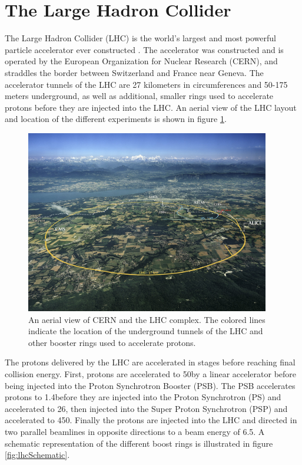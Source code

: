 \section{The Large Hadron Collider}
\label{sec:lhc}

The Large Hadron Collider (LHC) is the world's largest and most powerful particle accelerator ever constructed \cite{Evans:2008zzb}. The accelerator was constructed and is operated by the European Organization for Nuclear Research (CERN), and straddles the border between Switzerland and France near Geneva. The accelerator tunnels of the LHC are 27 kilometers in circumferences and 50-175 meters underground, as well as additional, smaller rings used to accelerate protons before they are injected into the LHC. An aerial view of the LHC layout and location of the different experiments is shown in figure \ref{fig:lhcAerial}.

\begin{figure}
	\centering
	\includegraphics[width=0.95\textwidth]{detector/figs/2048px-CERN_Aerial_View.jpg}
	\renewcommand{\baselinestretch}{1.0}
	\caption[An aerial view of CERN and the LHC complex.]{An aerial view of CERN and the LHC complex. The colored lines indicate the location of the underground tunnels of the LHC and other booster rings used to accelerate protons. \cite{cc}}
	\label{fig:lhcAerial}
\end{figure}

The protons delivered by the LHC are accelerated in stages before reaching final collision energy. First, protons are accelerated to 50\MeV by a linear accelerator before being injected into the Proton Synchrotron Booster (PSB). The PSB accelerates protons to 1.4\GeV before they are injected into the Proton Synchrotron (PS) and accelerated to 26\GeV, then injected into the Super Proton Synchrotron (PSP) and accelerated to 450\GeV. Finally the protons are injected into the LHC and directed in two parallel beamlines in opposite directions to a beam energy of 6.5\TeV. A schematic representation of the different boost rings is illustrated in figure \ref{fig:lhcSchematic}. 

